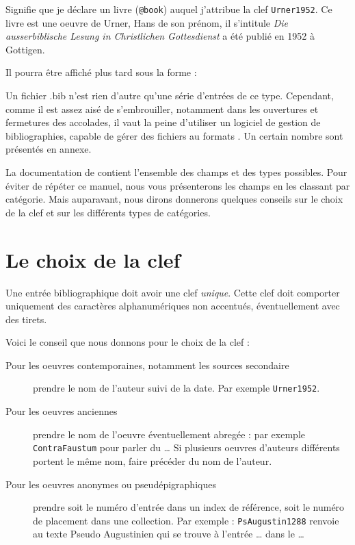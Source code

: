 Signifie que je déclare un livre (\verb|@book|) auquel j'attribue la clef \verb|Urner1952|. Ce livre est une oeuvre de Urner, Hans de son prénom, il s'intitule \emph{Die ausserbiblische Lesung in Christlichen Gottesdienst} a été publié en 1952 à Gottigen.


Il pourra être affiché plus tard sous la forme :

\begin{quote}
\cite{Urner1952}
\end{quote}



Un fichier .bib n'est rien d'autre qu'une  série d'entrées de ce type. Cependant, comme il est assez aisé de s'embrouiller, notamment dans les ouvertures et fermetures des accolades, il vaut la peine d'utiliser un logiciel de gestion de bibliographies, capable de gérer  des fichiers au formats . Un certain nombre sont présentés en annexe.

La documentation de  contient l'ensemble des champs et des types possibles. Pour éviter de répéter ce manuel, nous vous présenterons les champs en les classant par catégorie. Mais auparavant, nous dirons donnerons quelques conseils sur le choix de la clef et sur les différents types de catégories.

\section{Le choix de la clef}

Une entrée bibliographique doit avoir une clef \emph{unique}. Cette clef doit comporter uniquement des caractères alphanumériques non accentués, éventuellement avec des tirets. 

Voici le conseil que nous donnons pour le choix de la clef :
\begin{description}
\item[Pour les oeuvres contemporaines, notamment les sources secondaire] prendre le nom de l'auteur suivi de la date. Par exemple \verb|Urner1952|.
\item[Pour les oeuvres anciennes] prendre le nom de l'oeuvre  éventuellement abregée : par exemple \verb|ContraFaustum| pour parler du … Si plusieurs oeuvres d'auteurs différents portent le même nom, faire précéder du nom de l'auteur.
\item[Pour les oeuvres anonymes ou pseudépigraphiques] prendre soit le numéro d'entrée dans un index de référence, soit le numéro de placement dans une collection. Par exemple : \verb|PsAugustin1288| renvoie au texte Pseudo Augustinien qui se trouve à l'entrée … dans le …
\end{description}


